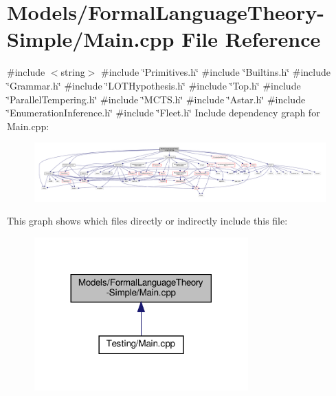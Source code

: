 \hypertarget{_models_2_formal_language_theory-_simple_2_main_8cpp}{}\section{Models/\+Formal\+Language\+Theory-\/\+Simple/\+Main.cpp File Reference}
\label{_models_2_formal_language_theory-_simple_2_main_8cpp}
{\ttfamily \#include $<$string$>$}\newline
{\ttfamily \#include \char`\"{}Primitives.\+h\char`\"{}}\newline
{\ttfamily \#include \char`\"{}Builtins.\+h\char`\"{}}\newline
{\ttfamily \#include \char`\"{}Grammar.\+h\char`\"{}}\newline
{\ttfamily \#include \char`\"{}L\+O\+T\+Hypothesis.\+h\char`\"{}}\newline
{\ttfamily \#include \char`\"{}Top.\+h\char`\"{}}\newline
{\ttfamily \#include \char`\"{}Parallel\+Tempering.\+h\char`\"{}}\newline
{\ttfamily \#include \char`\"{}M\+C\+T\+S.\+h\char`\"{}}\newline
{\ttfamily \#include \char`\"{}Astar.\+h\char`\"{}}\newline
{\ttfamily \#include \char`\"{}Enumeration\+Inference.\+h\char`\"{}}\newline
{\ttfamily \#include \char`\"{}Fleet.\+h\char`\"{}}\newline
Include dependency graph for Main.\+cpp\+:
\nopagebreak
\begin{figure}[H]
\begin{center}
\leavevmode
\includegraphics[width=350pt]{_models_2_formal_language_theory-_simple_2_main_8cpp__incl}
\end{center}
\end{figure}
This graph shows which files directly or indirectly include this file\+:
\nopagebreak
\begin{figure}[H]
\begin{center}
\leavevmode
\includegraphics[width=233pt]{_models_2_formal_language_theory-_simple_2_main_8cpp__dep__incl}
\end{center}
\end{figure}
